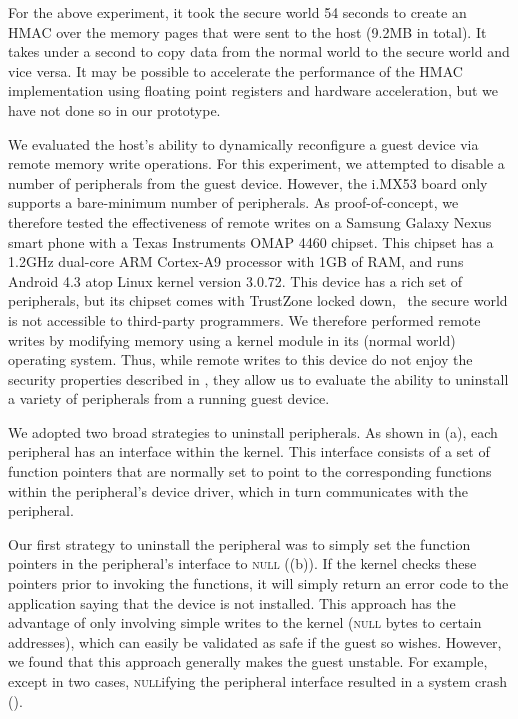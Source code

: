 For the above experiment, it took the secure world 54 seconds to create an HMAC
over the memory pages that were sent to the host (9.2MB in total). It takes
under a second to copy data from the normal world to the secure world and vice
versa. It may be possible to accelerate the performance of the HMAC
implementation using floating point registers and hardware acceleration, but we
have not done so in our prototype.


%
We evaluated the host's ability to dynamically reconfigure a guest device via
remote memory write operations. For this experiment, we attempted to disable a
number of peripherals from the guest device. However, the i.MX53 board only
supports a bare-minimum number of peripherals. As proof-of-concept, we
therefore tested the effectiveness of remote writes on a Samsung Galaxy Nexus
smart phone with a Texas Instruments OMAP 4460 chipset. This chipset has a
1.2GHz dual-core ARM Cortex-A9 processor with 1GB of RAM, and runs Android 4.3
atop Linux kernel version 3.0.72. This device has a rich set of peripherals,
but its chipset comes with TrustZone locked down, \ie~the secure world is not
accessible to third-party programmers.  We therefore performed remote writes by
modifying memory using a kernel module in its (normal world) operating system.
Thus, while remote writes to this device do not enjoy the security properties
described in , they allow us to evaluate the ability
to uninstall a variety of peripherals from a running guest device.

We adopted two broad strategies to uninstall peripherals. As shown in
(a), each peripheral has an interface within the
kernel.  This interface consists of a set of function pointers that are
normally set to point to the corresponding functions within the peripheral's
device driver, which in turn communicates with the peripheral. 

Our first strategy to uninstall the peripheral was to simply set the function
pointers in the peripheral's interface to \textsc{null}
((b)). If the kernel checks these pointers prior to
invoking the functions, it will simply return an error code to the application
saying that the device is not installed. This approach has the advantage of
only involving simple writes to the kernel (\textsc{null} bytes to certain
addresses), which can easily be validated as safe if the guest so wishes.
However, we found that this approach generally makes the guest unstable. For
example, except in two cases, \textsc{null}ifying the peripheral interface
resulted in a system crash ().

